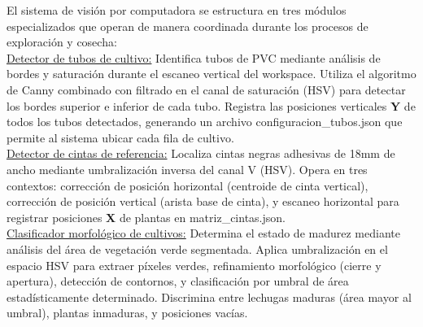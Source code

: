 El sistema de visión por computadora se estructura en tres módulos especializados que operan de manera coordinada durante los procesos de exploración y cosecha:\\

\underline{Detector de tubos de cultivo:} Identifica tubos de PVC mediante análisis de bordes y saturación durante el escaneo vertical del workspace. Utiliza el algoritmo de Canny combinado con filtrado en el canal de saturación (HSV) para detectar los bordes superior e inferior de cada tubo. Registra las posiciones verticales \textbf{Y} de todos los tubos detectados, generando un archivo configuracion\_tubos.json que permite al sistema ubicar cada fila de cultivo.\\

\underline{Detector de cintas de referencia:} Localiza cintas negras adhesivas de 18mm de ancho mediante umbralización inversa del canal V (HSV). Opera en tres contextos: corrección de posición horizontal (centroide de cinta vertical), corrección de posición vertical (arista base de cinta), y escaneo horizontal para registrar posiciones \textbf{X} de plantas en matriz\_cintas.json.\\

\underline{Clasificador morfológico de cultivos:} Determina el estado de madurez mediante análisis del área de vegetación verde segmentada. Aplica umbralización en el espacio HSV para extraer píxeles verdes, refinamiento morfológico (cierre y apertura), detección de contornos, y clasificación por umbral de área estadísticamente determinado. Discrimina entre lechugas maduras (área mayor al umbral), plantas inmaduras, y posiciones vacías.
